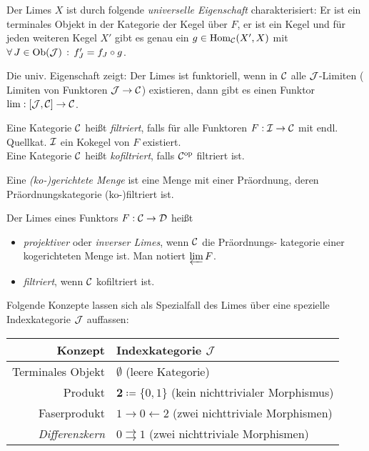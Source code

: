 \documentclass{cheat-sheet}
\begin{document}
\begin{samepage}
\begin{bem}
  Der Limes $X$ ist durch folgende \emph{universelle Eigenschaft} charakterisiert:
  Er ist ein terminales Objekt in der Kategorie der Kegel über $F$, \dh{} er ist ein Kegel und für jeden weiteren Kegel $X'$ gibt es genau ein $g \in \operatorname{Hom}_{\mathcal{C}}(X', X)$ mit
  $\forall \, {J \in \operatorname{Ob}(\mathcal{J})} \,:\, f'_J = f_J \circ g$.
\end{bem}

\begin{bem}
  Die univ. Eigenschaft zeigt: Der Limes ist funktoriell, \dh{} wenn in $\mathcal{C}$ alle $\mathcal{J}$-Limiten (\dh{} Limiten von Funktoren $\mathcal{J} \to \mathcal{C}$) existieren, dann gibt es einen Funktor $\lim : [\mathcal{J}, \mathcal{C}] \to \mathcal{C}$.
\end{bem}

\begin{defn}
  Eine Kategorie $\mathcal{C}$ heißt \emph{filtriert}, falls für alle Funktoren $F : \mathcal{I} \to \mathcal{C}$ mit endl. Quellkat. $\mathcal{I}$ ein Kokegel von $F$ existiert. \\
  Eine Kategorie $\mathcal{C}$ heißt \emph{kofiltriert}, falls $\mathcal{C}^{\mathrm{op}}$ filtriert ist.
\end{defn}

\begin{defn}
  Eine \emph{(ko-)gerichtete Menge} ist eine Menge mit einer Präordnung, deren Präordnungskategorie (ko-)filtriert ist.
\end{defn}

\end{samepage}

\begin{defn}
  Der Limes eines Funktors $F : \mathcal{C} \to \mathcal{D}$ heißt
  \begin{itemize}
    \item \emph{projektiver} oder \emph{inverser Limes}, wenn $\mathcal{C}$ die Präordnungs- kategorie einer kogerichteten Menge ist. Man notiert $\varprojlim F$.
    \item \emph{filtriert}, wenn $\mathcal{C}$ kofiltriert ist.
  \end{itemize}
\end{defn}

\begin{bem}
  Folgende Konzepte lassen sich als Spezialfall des Limes über eine spezielle Indexkategorie $\mathcal{J}$ auffassen:
  \begin{center}
    \begin{tabular}{ | r | l | }
      \hline
      Konzept & Indexkategorie $\mathcal{J}$ \\ \hline
      Terminales Objekt & $\emptyset$ (leere Kategorie) \\
      Produkt & $\mathbf{2} \coloneqq \{ 0, 1 \}$ (kein nichttrivialer Morphismus) \\
      Faserprodukt & $1 \to 0 \leftarrow 2$ (zwei nichttriviale Morphismen) \\
      \emph{Differenzkern} &  $0 \rightrightarrows 1$ (zwei nichttriviale Morphismen) \\ \hline
    \end{tabular}
  \end{center}
\end{bem}
\end{document}
